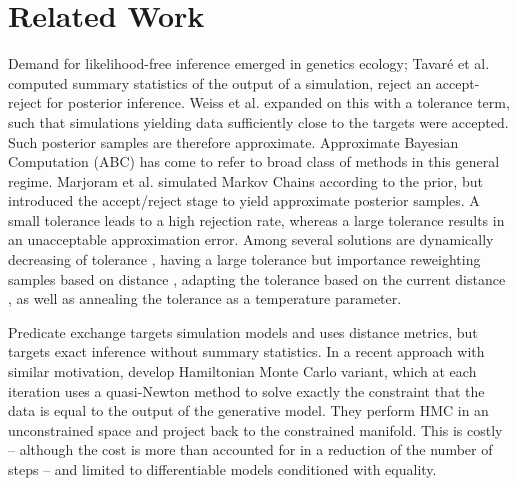 \section{Related Work}

Demand for likelihood-free inference emerged in genetics ecology; Tavar{\'e} et al. \citep{tavare1997inferring} computed summary statistics of the output of a simulation, reject an accept-reject for posterior inference.
Weiss et al. \cite{weiss1998inference} expanded on this with a tolerance term, such that simulations yielding data sufficiently close to the targets were accepted.
Such posterior samples are therefore approximate.
Approximate Bayesian Computation (ABC) has come to refer to broad class of methods \cite{beaumont2002approximate,sisson2007sequential} in this general regime.
Marjoram et al. \cite{marjoram2003markov} simulated Markov Chains according to the prior, but introduced the accept/reject stage to yield approximate posterior samples.
A small tolerance leads to a high rejection rate, whereas a large tolerance results in an unacceptable approximation error.
Among several solutions are dynamically decreasing of tolerance \cite{toni2008approximate}, having a large tolerance but importance reweighting samples based on distance \cite{wegmann2009efficient}, adapting the tolerance based on the current distance \cite{del2012adaptive,lenormand2013adaptive}, as well as annealing the tolerance as a temperature parameter.

Predicate exchange targets simulation models and uses distance metrics, but targets exact inference without summary statistics.
In a recent approach with similar motivation, \cite{graham2017asymptotically} develop Hamiltonian Monte Carlo variant, which at each iteration uses a quasi-Newton method to solve exactly the constraint that the data is equal to the output of the generative model.  They perform HMC in an unconstrained space and project back to the constrained manifold.
This is costly -- although the cost is more than accounted for in a reduction of the number of steps -- and limited to differentiable models conditioned with equality. 


